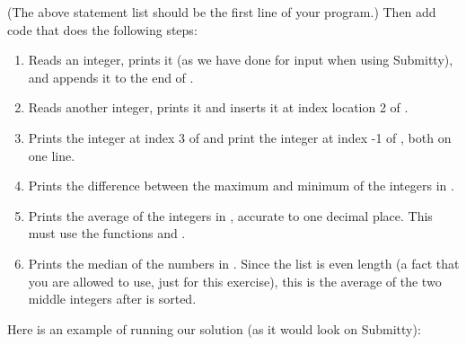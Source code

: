 \documentclass[letterpaper,10pt,english]{sphinxmanual}
\begin{document}
\begin{enumerate}
%
\begin{sphinxVerbatim}[commandchars=\\\{\}]
  \PYG{p}{[}       \PYG{p}{]}
\end{sphinxVerbatim}

(The above statement list should be the first line of your
program.)  Then add code that does the following steps:
\begin{enumerate}
\item {} 
Reads an integer, prints it (as we have done for input when using
Submitty), and appends it to the end of .

\item {} 
Reads another integer, prints it and inserts it at index
location 2 of .

\item {} 
Prints the integer at index 3 of  and print the
integer at index -1 of , both on one line.

\item {} 
Prints the difference between the maximum and minimum of the
integers in .

\item {} 
Prints the average of the integers in , accurate to
one decimal place.  This must use the functions  and
.

\item {} 
Prints the median of the numbers in .  Since the list
is even length (a fact that you are allowed to use, just for this
exercise), this is the average of the two middle integers after
 is sorted.

\end{enumerate}

Here is an example of running our solution (as it would look on Submitty):

%
\begin{sphinxVerbatim}[commandchars=\\\{\}]
   
   
 
 
 
 
\end{sphinxVerbatim}

\end{enumerate}
\end{document}
